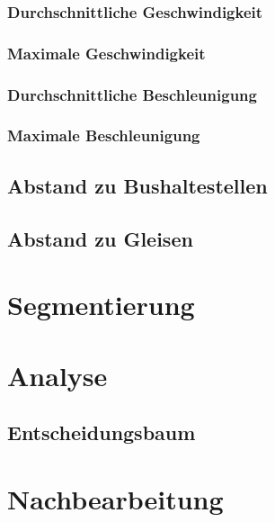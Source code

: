 \subsubsection{Durchschnittliche Geschwindigkeit}
\subsubsection{Maximale Geschwindigkeit}
\subsubsection{Durchschnittliche Beschleunigung}
\subsubsection{Maximale Beschleunigung}
\subsection{Abstand zu Bushaltestellen}
\subsection{Abstand zu Gleisen}

\section{Segmentierung}


\section{Analyse}
\subsection{Entscheidungsbaum}

\section{Nachbearbeitung}
